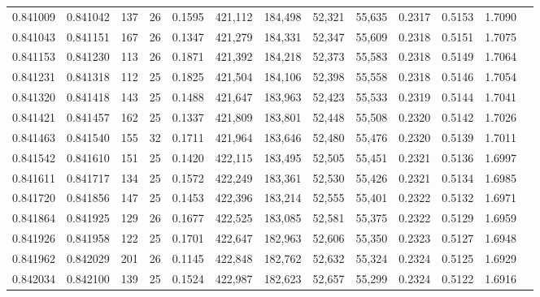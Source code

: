 \begin{tabular}{rrrrrrrrrrrrr}
0.841009 & 0.841042 &   137 &  26 &                                     0.1595 & 421,112 & 184,498 &  52,321 &  55,635 & 0.2317 & 0.5153 & 1.7090 \\
0.841043 & 0.841151 &   167 &  26 &                                     0.1347 & 421,279 & 184,331 &  52,347 &  55,609 & 0.2318 & 0.5151 & 1.7075 \\
0.841153 & 0.841230 &   113 &  26 &                                     0.1871 & 421,392 & 184,218 &  52,373 &  55,583 & 0.2318 & 0.5149 & 1.7064 \\
0.841231 & 0.841318 &   112 &  25 &                                     0.1825 & 421,504 & 184,106 &  52,398 &  55,558 & 0.2318 & 0.5146 & 1.7054 \\
0.841320 & 0.841418 &   143 &  25 &                                     0.1488 & 421,647 & 183,963 &  52,423 &  55,533 & 0.2319 & 0.5144 & 1.7041 \\
0.841421 & 0.841457 &   162 &  25 &                                     0.1337 & 421,809 & 183,801 &  52,448 &  55,508 & 0.2320 & 0.5142 & 1.7026 \\
0.841463 & 0.841540 &   155 &  32 &                                     0.1711 & 421,964 & 183,646 &  52,480 &  55,476 & 0.2320 & 0.5139 & 1.7011 \\
0.841542 & 0.841610 &   151 &  25 &                                     0.1420 & 422,115 & 183,495 &  52,505 &  55,451 & 0.2321 & 0.5136 & 1.6997 \\
0.841611 & 0.841717 &   134 &  25 &                                     0.1572 & 422,249 & 183,361 &  52,530 &  55,426 & 0.2321 & 0.5134 & 1.6985 \\
0.841720 & 0.841856 &   147 &  25 &                                     0.1453 & 422,396 & 183,214 &  52,555 &  55,401 & 0.2322 & 0.5132 & 1.6971 \\
0.841864 & 0.841925 &   129 &  26 &                                     0.1677 & 422,525 & 183,085 &  52,581 &  55,375 & 0.2322 & 0.5129 & 1.6959 \\
0.841926 & 0.841958 &   122 &  25 &                                     0.1701 & 422,647 & 182,963 &  52,606 &  55,350 & 0.2323 & 0.5127 & 1.6948 \\
0.841962 & 0.842029 &   201 &  26 &                                     0.1145 & 422,848 & 182,762 &  52,632 &  55,324 & 0.2324 & 0.5125 & 1.6929 \\
0.842034 & 0.842100 &   139 &  25 &                                     0.1524 & 422,987 & 182,623 &  52,657 &  55,299 & 0.2324 & 0.5122 & 1.6916 \\

\end{tabular}
